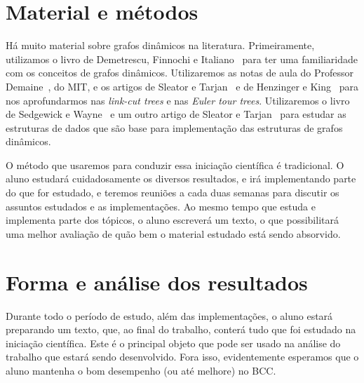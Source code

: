 \documentclass[12pt]{article}
\begin{document}





\section{Material e métodos}

Há muito material sobre grafos dinâmicos na literatura.
Primeiramente, utilizamos o livro de Demetrescu, Finnochi e Italiano~\cite{DemetrescuFI2004} 
para ter uma familiaridade com os conceitos de grafos dinâmicos. 
Utilizaremos as notas de aula do Professor Demaine~\cite{DemaineHJSI2012, DemaineL2007}, do MIT, 
e os artigos de Sleator e Tarjan~\cite{SleatorT1983} e de Henzinger e King~\cite{HenzingerK1995} 
para nos aprofundarmos nas \emph{link-cut trees} e nas \emph{Euler tour trees}. 
Utilizaremos o livro de Sedgewick e Wayne~\cite{SedgewickW2011} e um outro artigo de 
Sleator e Tarjan~\cite{SleatorT1985} para estudar as estruturas de dados que são base 
para implementação das estruturas de grafos dinâmicos.

O método que usaremos para conduzir essa iniciação científica é tradicional. 
O aluno estudará cuidadosamente os diversos resultados, e irá implementando 
parte do que for estudado, e teremos reuniões a cada duas semanas para discutir 
os assuntos estudados e as implementações.  Ao mesmo tempo que estuda e implementa
parte dos tópicos, o aluno escreverá um texto, o que possibilitará uma melhor 
avaliação de quão bem o material estudado está sendo absorvido.

\section{Forma e análise dos resultados}

Durante todo o período de estudo, além das implementações, o aluno estará preparando 
um texto, que, ao final do trabalho, conterá tudo que foi estudado na iniciação científica. 
Este é o principal objeto que pode ser usado na análise do trabalho que estará sendo desenvolvido.
Fora isso, evidentemente esperamos que o aluno mantenha o bom desempenho (ou até melhore) no BCC. 



\end{document}

